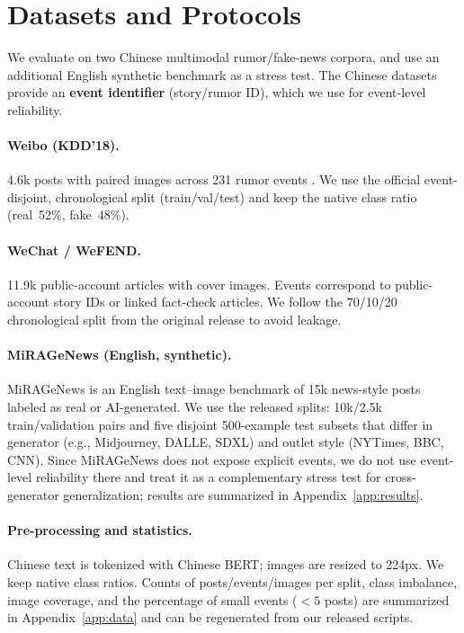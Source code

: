 \section{Datasets and Protocols}
We evaluate on two Chinese multimodal rumor/fake-news corpora, and use an additional English synthetic benchmark as a stress test. The Chinese datasets provide an \textbf{event identifier} (story/rumor ID), which we use for event-level reliability.

\paragraph{Weibo (KDD'18).} 4.6k posts with paired images across 231 rumor events \citep{Wang2018EANN}. We use the official event-disjoint, chronological split (train/val/test) and keep the native class ratio (real~52\%, fake~48\%).

\paragraph{WeChat / WeFEND.} 11.9k public-account articles with cover images. Events correspond to public-account story IDs or linked fact-check articles. We follow the 70/10/20 chronological split from the original release to avoid leakage.

\paragraph{MiRAGeNews (English, synthetic).} MiRAGeNews is an English text--image benchmark of 15k news-style posts labeled as real or AI-generated. We use the released splits: 10k/2.5k train/validation pairs and five disjoint 500-example test subsets that differ in generator (e.g., Midjourney, DALL\raisebox{.5pt}{\textbullet}E, SDXL) and outlet style (NYTimes, BBC, CNN). Since MiRAGeNews does not expose explicit events, we do not use event-level reliability there and treat it as a complementary stress test for cross-generator generalization; results are summarized in Appendix~\ref{app:results}.

\paragraph{Pre-processing and statistics.} Chinese text is tokenized with Chinese BERT; images are resized to 224px. We keep native class ratios. Counts of posts/events/images per split, class imbalance, image coverage, and the percentage of small events (\(<5\) posts) are summarized in Appendix~\ref{app:data} and can be regenerated from our released scripts.

